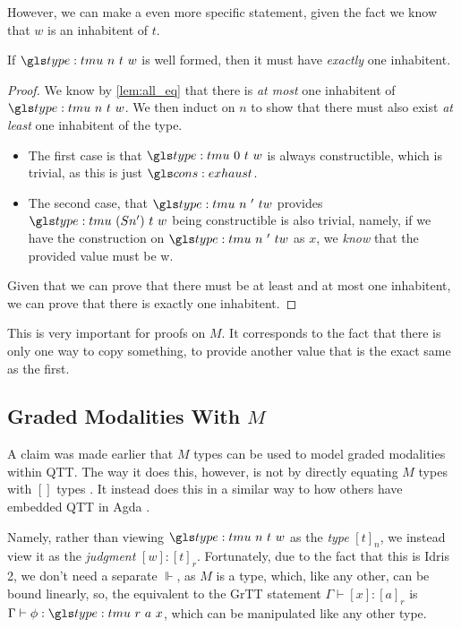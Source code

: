 However, we can make a even more specific statement, given the fact we know that $w$ is an inhabitent of $t$.
\begin{theorem}[Uniqueness]
	\label{thm:unique}
	If $\tm n t w$ is well formed, then it must have \emph{exactly} one inhabitent.
\end{theorem}
\begin{proof}
	We know by \ref{lem:all_eq} that there is \emph{at most} one inhabitent of $\tm n t w$. 
	We then induct on $n$ to show that there must also exist \emph{at least} one inhabitent of the type.
	\begin{itemize}
		\item The first case is that $\tm 0 t w$ is always constructible, which is trivial, as this is just $\mz$.
		\item The second case, that $\tm n' t w$ provides $\tm {(S n')} t w$ being constructible is also trivial, namely, if we have the construction on $\tm n' t w$ as $x$, we \emph{know} that the provided value must be \sigil w.
	\end{itemize}
	
	Given that we can prove that there must be at least and at most one inhabitent, we can prove that there is exactly one inhabitent.
\end{proof}

This is very important for proofs on $M$.
It corresponds to the fact that there is only one way to copy something, to provide another value that is the exact same as the first.

\subsection{Graded Modalities With $M$}

\label{sec:grade_mu}
A claim was made earlier that $M$ types can be used to model graded modalities within QTT.
The way it does this, however, is not by directly equating $M$ types with $[]$ types \cite{quant_graded_modal}.
It instead does this in a similar way to how others have embedded QTT in Agda \cite{lin_dyn_mult_dep,dep_mult_dep_lin}. 

Namely, rather than viewing $\tm n t w$ as the \emph{type} $[t]_n$, we instead view it as the \emph{judgment} $[w] : [t]_r$.
Fortunately, due to the fact that this is Idris 2, we don't need a separate $\Vdash$, as $M$ is a type, which, like any other, can be bound linearly, so, the equivalent to the GrTT statement $\Gamma \vdash [x] : [a]_r$ is $\Gamma \vdash \phi : \tm r a x$, which can be manipulated like any other type.

